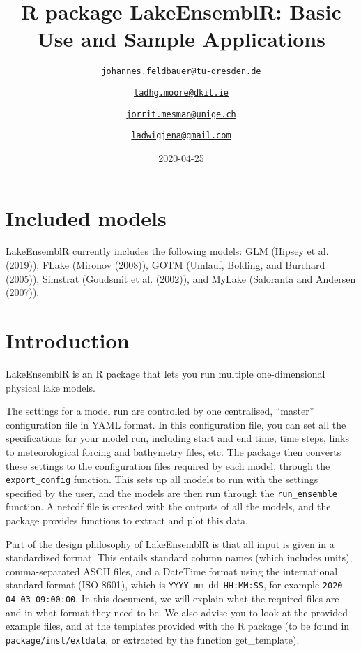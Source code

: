 \documentclass[
]{article}
\title{R package LakeEnsemblR: Basic Use and Sample Applications}
\author{\href{mailto:johannes.feldbauer@tu-dresden.de}{\nolinkurl{johannes.feldbauer@tu-dresden.de}} \and \href{mailto:tadhg.moore@dkit.ie}{\nolinkurl{tadhg.moore@dkit.ie}} \and \href{mailto:jorrit.mesman@unige.ch}{\nolinkurl{jorrit.mesman@unige.ch}} \and \href{mailto:ladwigjena@gmail.com}{\nolinkurl{ladwigjena@gmail.com}}}
\date{2020-04-25}
\begin{document}
\maketitle

{
\setcounter{tocdepth}{3}
\tableofcontents
}
\hypertarget{included-models}{%
\section{Included models}\label{included-models}}

LakeEnsemblR currently includes the following models: GLM (Hipsey et al.
(2019)), FLake (Mironov (2008)), GOTM (Umlauf, Bolding, and Burchard
(2005)), Simstrat (Goudsmit et al. (2002)), and MyLake (Saloranta and
Andersen (2007)).

\hypertarget{introduction}{%
\section{Introduction}\label{introduction}}

LakeEnsemblR is an R package that lets you run multiple one-dimensional
physical lake models.

The settings for a model run are controlled by one centralised,
``master'' configuration file in YAML format. In this configuration
file, you can set all the specifications for your model run, including
start and end time, time steps, links to meteorological forcing and
bathymetry files, etc. The package then converts these settings to the
configuration files required by each model, through the
\texttt{export\_config} function. This sets up all models to run with
the settings specified by the user, and the models are then run through
the \texttt{run\_ensemble} function. A netcdf file is created with the
outputs of all the models, and the package provides functions to extract
and plot this data.

Part of the design philosophy of LakeEnsemblR is that all input is given
in a standardized format. This entails standard column names (which
includes units), comma-separated ASCII files, and a DateTime format
using the international standard format (ISO 8601), which is
\texttt{YYYY-mm-dd\ HH:MM:SS}, for example
\texttt{2020-04-03\ 09:00:00}. In this document, we will explain what
the required files are and in what format they need to be. We also
advise you to look at the provided example files, and at the templates
provided with the R package (to be found in
\texttt{package/inst/extdata}, or extracted by the function
get\_template).
\end{document}
